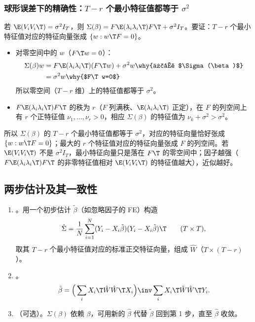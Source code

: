 \subsubsection{球形误差下的精确性：\texorpdfstring{$T-r$}{T-r} 个最小特征值都等于 \texorpdfstring{$\sigma^2$}{sigma\^{}2}}

若 $\E(V_iV_i\T)=\sigma^2I_T$，则 $\Sigma(\beta)=F\E(\lambda_i\lambda_i\T)F\T+\sigma^2I_T$。要证：$T-r$ 个最小特征值对应的特征向量张成 $\{w:w\T F=0\}$。
\begin{itemize}
  \item 对零空间中的 $w$（$F\T w=0$）：
  \begin{align*}
  \Sigma(\beta)w &= F\E(\lambda_i\lambda_i\T)(F\T w)+\sigma^2w \why{代入 $\Sigma(\beta)$}\\
  &= \sigma^2w \why{$F\T w=0$}
  \end{align*}
  所以零空间（$T-r$ 维）上的特征值都等于 $\sigma^2$。
  \item $F\E(\lambda_i\lambda_i\T)F\T$ 的秩为 $r$（$F$ 列满秩、$\E(\lambda_i\lambda_i\T)$ 正定），在 $F$ 的列空间上有 $r$ 个正特征值 $\nu_1,\dots,\nu_r>0$，相应 $\Sigma(\beta)$ 的特征值为 $\nu_k+\sigma^2>\sigma^2$。
\end{itemize}
所以 $\Sigma(\beta)$ 的 $T-r$ 个最小特征值都等于 $\sigma^2$，对应的特征向量恰好张成 $\{w:w\T F=0\}$；最大的 $r$ 个特征值对应的特征向量张成 $F$ 的列空间。若 $\E(V_iV_i\T)$ 不是 $\sigma^2I_T$，最小特征向量只是落在 $F\T$ 的零空间中；因子越强（$F\E(\lambda_i\lambda_i\T)F\T$ 的非零特征值相对 $\E(V_iV_i\T)$ 的特征值越大），近似越好。

\subsection{两步估计及其一致性}\label{sec:U14b-twostep}

\begin{method}[变换估计的两步法]
\begin{enumerate}[label=第 \arabic* 步：,leftmargin=4.2em]
  \item {}。用一个初步估计 $\tilde\beta$（如忽略因子的 FE）构造
  \[
  \hat\Sigma=\frac1N\sum_{i=1}^N(Y_i-X_i\tilde\beta)(Y_i-X_i\tilde\beta)\T\qquad(T\times T),
  \]
  取其 $T-r$ 个最小特征值对应的标准正交特征向量，组成 $\hat W$（$T\times(T-r)$）。
  \item {}。
  \[
  \hat\beta=\Big(\sum_iX_i\T\hat W\hat W\T X_i\Big)\inv\sum_iX_i\T\hat W\hat W\T Y_i .
  \]
  \item （可选）。$\Sigma(\beta)$ 依赖 $\beta$，可用新的 $\hat\beta$ 代替 $\tilde\beta$ 回到第 1 步，直至 $\hat\beta$ 收敛。
\end{enumerate}
\end{method}


